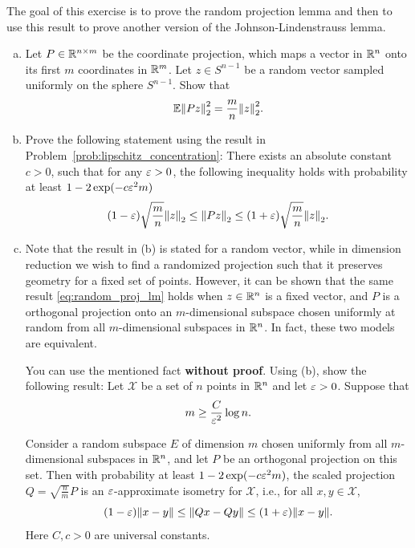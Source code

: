 \begin{myexercise}
    \label{prob:jl_lemma}
    The goal of this exercise is to prove the random projection lemma and then to use this result to prove another version of the Johnson-Lindenstrauss lemma.
    \begin{enumerate}[(a)]
        \item Let $P \in \mathbb{R}^{n\times m}$ be the coordinate projection, which maps a vector in $\mathbb{R}^n$ onto its first $m$ coordinates in $\mathbb{R}^m$. Let $z\in S^{n-1}$ be a random vector sampled uniformly on the sphere $S^{n-1}$. Show that 
        \begin{equation*}
            \mathbb{E}{\left\lVert{Pz}\right\rVert}_2^2 = \frac{m}{n} {\left\lVert{z}\right\rVert}_2^2.
        \end{equation*}
        
        \item Prove the following statement using the result in Problem~\ref{prob:lipschitz_concentration}: There exists an absolute constant $c > 0$, such that for any $\varepsilon > 0$, the following inequality holds with probability at least $1-2\exp(-c\varepsilon^2 m)$
        \begin{equation}\label{eq:random_proj_lm}
            (1-\varepsilon)\sqrt{\frac{m}{n}}{\left\lVert{z}\right\rVert}_2\le {\left\lVert{Pz}\right\rVert}_2\le (1+\varepsilon)\sqrt{\frac{m}{n}}{\left\lVert{z}\right\rVert}_2.
        \end{equation}
        
        \item Note that the result in (b) is stated for a random vector, while in dimension reduction we wish to find a randomized projection such that it preserves geometry for a fixed set of points. However, it can be shown that the same result \eqref{eq:random_proj_lm} holds when $z\in\mathbb{R}^n$ is a fixed vector, and $P$ is a orthogonal projection onto an $m$-dimensional subspace chosen uniformly at random from all $m$-dimensional subspaces in $\mathbb{R}^n$. In fact, these two models are equivalent.
        
        You can use the mentioned fact \textbf{without proof}. Using (b), show the following result: Let $\mathcal{X}$ be a set of $n$ points in $\mathbb{R}^n$ and let $\varepsilon > 0$. Suppose that 
        \begin{equation*}
            m \geq \frac{C}{\varepsilon^2} \log n.
        \end{equation*}
        
        Consider a random subspace $E$ of dimension $m$ chosen uniformly from all $m$-dimensional subspaces in $\mathbb{R}^n$, and let $P$ be an orthogonal projection on this set. Then with probability at least $1 - 2 \exp(-c \varepsilon^2 m)$, the scaled projection $Q = \sqrt{\tfrac{n}{m}} P$ is an $\varepsilon$-approximate isometry for $\mathcal{X}$, i.e., for all $x, y \in \mathcal{X}$,
        \begin{equation*}
            (1 - \varepsilon) \| x - y \| \le \| Q x - Q y \| \le (1 + \varepsilon) \| x - y\|.
        \end{equation*}
        Here $C,c > 0$ are universal constants.
    \end{enumerate}
\end{myexercise}

